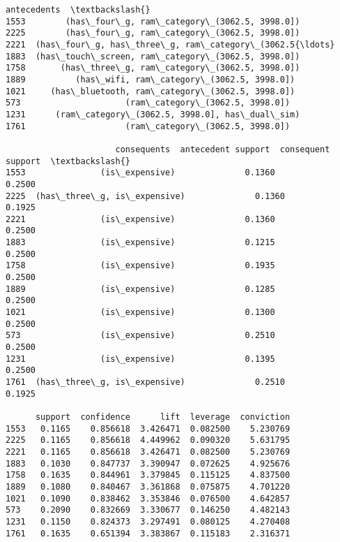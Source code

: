 \documentclass[11pt]{article}
\makeatletter
\newcommand{\boxspacing}{\kern\kvtcb@left@rule\kern\kvtcb@boxsep}
\newcommand{\prompt}[4]{
        {\ttfamily\llap{{\color{#2}[#3]:\hspace{3pt}#4}}\vspace{-\baselineskip}}
    }
\makeatother
\begin{document}
            \begin{tcolorbox}[breakable, size=fbox, boxrule=.5pt, pad at break*=1mm, opacityfill=0]
\prompt{Out}{outcolor}{94}{\boxspacing}
\begin{Verbatim}[commandchars=\\\{\}]
                                            antecedents  \textbackslash{}
1553        (has\_four\_g, ram\_category\_(3062.5, 3998.0])
2225        (has\_four\_g, ram\_category\_(3062.5, 3998.0])
2221  (has\_four\_g, has\_three\_g, ram\_category\_(3062.5{\ldots}
1883  (has\_touch\_screen, ram\_category\_(3062.5, 3998.0])
1758       (has\_three\_g, ram\_category\_(3062.5, 3998.0])
1889          (has\_wifi, ram\_category\_(3062.5, 3998.0])
1021     (has\_bluetooth, ram\_category\_(3062.5, 3998.0])
573                     (ram\_category\_(3062.5, 3998.0])
1231      (ram\_category\_(3062.5, 3998.0], has\_dual\_sim)
1761                    (ram\_category\_(3062.5, 3998.0])

                      consequents  antecedent support  consequent support  \textbackslash{}
1553               (is\_expensive)              0.1360              0.2500
2225  (has\_three\_g, is\_expensive)              0.1360              0.1925
2221               (is\_expensive)              0.1360              0.2500
1883               (is\_expensive)              0.1215              0.2500
1758               (is\_expensive)              0.1935              0.2500
1889               (is\_expensive)              0.1285              0.2500
1021               (is\_expensive)              0.1300              0.2500
573                (is\_expensive)              0.2510              0.2500
1231               (is\_expensive)              0.1395              0.2500
1761  (has\_three\_g, is\_expensive)              0.2510              0.1925

      support  confidence      lift  leverage  conviction
1553   0.1165    0.856618  3.426471  0.082500    5.230769
2225   0.1165    0.856618  4.449962  0.090320    5.631795
2221   0.1165    0.856618  3.426471  0.082500    5.230769
1883   0.1030    0.847737  3.390947  0.072625    4.925676
1758   0.1635    0.844961  3.379845  0.115125    4.837500
1889   0.1080    0.840467  3.361868  0.075875    4.701220
1021   0.1090    0.838462  3.353846  0.076500    4.642857
573    0.2090    0.832669  3.330677  0.146250    4.482143
1231   0.1150    0.824373  3.297491  0.080125    4.270408
1761   0.1635    0.651394  3.383867  0.115183    2.316371
\end{Verbatim}
\end{tcolorbox}
        
\end{document}

